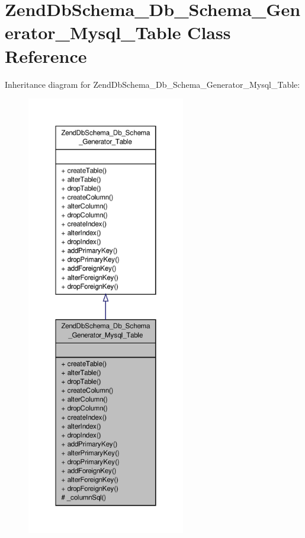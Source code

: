 \hypertarget{classZendDbSchema__Db__Schema__Generator__Mysql__Table}{\section{Zend\-Db\-Schema\-\_\-\-Db\-\_\-\-Schema\-\_\-\-Generator\-\_\-\-Mysql\-\_\-\-Table Class Reference}
\label{classZendDbSchema__Db__Schema__Generator__Mysql__Table}
}


Inheritance diagram for Zend\-Db\-Schema\-\_\-\-Db\-\_\-\-Schema\-\_\-\-Generator\-\_\-\-Mysql\-\_\-\-Table\-:\nopagebreak
\begin{figure}[H]
\begin{center}
\leavevmode
\includegraphics[height=550pt]{classZendDbSchema__Db__Schema__Generator__Mysql__Table__inherit__graph}
\end{center}
\end{figure}


